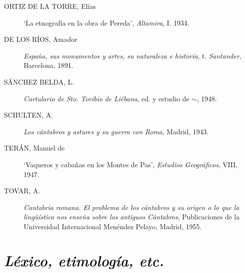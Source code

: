 \documentclass[11pt,spanish,b5paper]{book}
\begin{document}
\begin{description}
\item[ORTIZ DE LA TORRE, Elías] `La etnografía en la obra de Pereda', \textit{Altamira}, I. 1934.
\item[DE LOS RÍOS, Amador] \textit{España, sus monumentos y artes, su naturaleza e historia}, t. \textit{Santander}, Barcelona, 1891. 
\item[SÁNCHEZ BELDA, L.] \textit{Cartulario de Sto. Toribio de Liébana}, ed. y estudio de $\sim$, 1948.
\item[SCHULTEN, A.] \textit{Los cántabros y astures y su guerra con Roma}, Madrid, 1943. 
\item[TERÁN, Manuel de] `Vaqueros y cabañas en los Montes de Pas', \textit{Estudios Geográficos}, VIII, 1947.
\item[TOVAR, A.] \textit{Cantabria romana. El problema de los cántabros y su origen o lo que la lingüística nos enseña sobre los antiguos Cántabros}, Publicaciones de la Universidad Internacional Menéndez Pelayo, Madrid, 1955.
\end{description}

\section{\emph{Léxico, etimología, etc.}}
\end{document}
